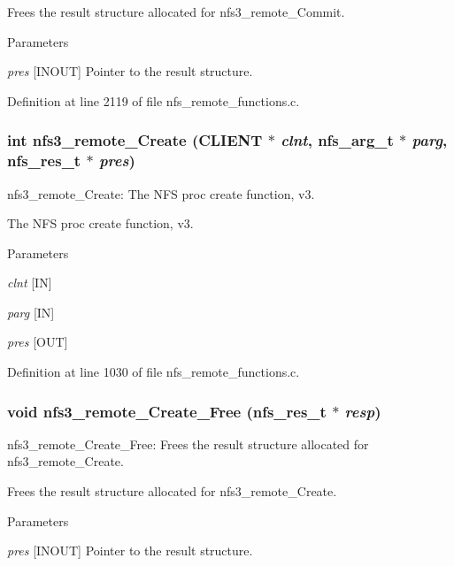 Frees the result structure allocated for nfs3\_\-remote\_\-Commit.


\begin{DoxyParams}{Parameters}
\item[{\em pres}][INOUT] Pointer to the result structure. \end{DoxyParams}


Definition at line 2119 of file nfs\_\-remote\_\-functions.c.
\subsubsection[{nfs3\_\-remote\_\-Create}]{\setlength{\rightskip}{0pt plus 5cm}int nfs3\_\-remote\_\-Create (CLIENT $\ast$ {\em clnt}, \/  nfs\_\-arg\_\-t $\ast$ {\em parg}, \/  nfs\_\-res\_\-t $\ast$ {\em pres})}\label{group__NFSprocs_ga0ecb4d67d86bb1787ddd38510b4f76a7}
nfs3\_\-remote\_\-Create: The NFS proc create function, v3.

The NFS proc create function, v3.


\begin{DoxyParams}{Parameters}
\item[{\em clnt}][IN] \item[{\em parg}][IN] \item[{\em pres}][OUT] \end{DoxyParams}


Definition at line 1030 of file nfs\_\-remote\_\-functions.c.
\subsubsection[{nfs3\_\-remote\_\-Create\_\-Free}]{\setlength{\rightskip}{0pt plus 5cm}void nfs3\_\-remote\_\-Create\_\-Free (nfs\_\-res\_\-t $\ast$ {\em resp})}\label{group__NFSprocs_ga74df3cbf4809a25911d3bd39be9366f4}
nfs3\_\-remote\_\-Create\_\-Free: Frees the result structure allocated for nfs3\_\-remote\_\-Create.

Frees the result structure allocated for nfs3\_\-remote\_\-Create.


\begin{DoxyParams}{Parameters}
\item[{\em pres}][INOUT] Pointer to the result structure. \end{DoxyParams}



